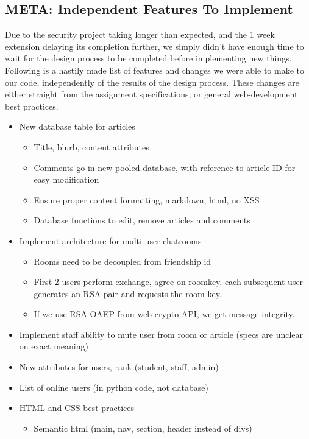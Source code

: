 \documentclass[12pt]{article}
\begin{document}
\subsection{META: Independent Features To Implement}

Due to the security project taking longer than expected, and the 1 week extension delaying its completion further, we simply didn't have enough time to wait for the design process to be completed before implementing new things. Following is a hastily made list of features and changes we were able to make to our code, independently of the results of the design process. These changes are either straight from the assignment specifications, or general web-development best practices.

\begin{itemize}
    \item New database table for articles
    \begin{itemize}
        \item Title, blurb, content attributes
        \item Comments go in new pooled database, with reference to article ID for easy modification
        \item Ensure proper content formatting, markdown, html, no XSS
        \item Database functions to edit, remove articles and comments
    \end{itemize}
    \item Implement architecture for multi-user chatrooms
    \begin{itemize}
        \item Rooms need to be decoupled from friendship id
        \item First 2 users perform exchange, agree on roomkey. each subsequent user generates an RSA pair and requests the room key.
        \item If we use RSA-OAEP from web crypto API, we get message integrity.
    \end{itemize}
    \item Implement staff ability to mute user from room or article (specs are unclear on exact meaning)
    \item New attributes for users, rank (student, staff, admin)
    \item List of online users (in python code, not database)
    \item HTML and CSS best practices
    \begin{itemize}
        \item Semantic html (main, nav, section, header instead of divs)

\end{itemize}
\end{itemize}
\end{document}
